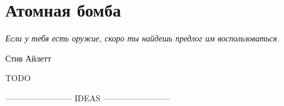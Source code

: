 \chapter{Атомная бомба}\label{how_to_build_bomb}

\epigraph{\emph{Если у тебя есть оружие, \break скоро ты найдешь предлог им воспользоваться.}}{Стив Айлетт}

TODO

------------------------ IDEAS ------------------------ 


